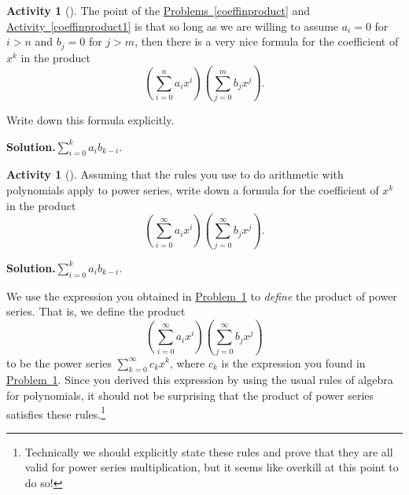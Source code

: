 \documentclass[10pt,]{book}
\theoremstyle{plain}
\theoremstyle{definition}
\newtheorem{activity}[project]{Activity}
\numberwithin{equation}{chapter}
\begin{document}
\begin{activity}[]\label{activity-162}
The point of the \hyperref[coeffinproduct]{Problems~\ref{coeffinproduct}} and \hyperref[coeffinproduct1]{Activity~\ref{coeffinproduct1}} is that so long as we are willing to assume \(a_i=0\) for \(i>n\) and \(b_j =0\) for \(j>m\), then there is a very nice formula for the coefficient of \(x^k\) in the product%
\begin{equation*}
\left(\sum_{i=0}^n a_ix^i\right)\left(\sum_{j=0}^m b_jx^j\right).
\end{equation*}
%
\par
Write down this formula explicitly.%
\par\medskip\noindent%
\textbf{Solution.}\quad \(\sum_{i=0}^k a_ib_{k-i}\).%
\end{activity}
\begin{activity}[]\label{coeffinpowerseries}
Assuming that the rules you use to do arithmetic with polynomials apply to power series, write down a formula for the coefficient of \(x^k\) in the product%
\begin{equation*}
\left(\sum_{i=0}^\infty a_ix^i\right)\left(\sum_{j=0}^\infty
b_jx^j\right).
\end{equation*}
%
\par\medskip\noindent%
\textbf{Solution.}\quad \(\sum_{i=0}^k a_ib_{k-i}\).%
\end{activity}
We use the expression you obtained in \hyperref[coeffinpowerseries]{Problem~\ref{coeffinpowerseries}} to \emph{define} the product of power series. That is, we define the product%
\begin{equation*}
\left(\sum_{i=0}^\infty a_ix^i\right)\left(\sum_{j=0}^\infty
b_jx^j\right)
\end{equation*}
to be the power series \(\sum_{k=0}^\infty c_k x^k\), where \(c_k\) is the expression you found in \hyperref[coeffinpowerseries]{Problem~\ref{coeffinpowerseries}}. Since you derived this expression by using the usual rules of algebra for polynomials, it should not be surprising that the product of power series satisfies these rules.\footnote{Technically we should explicitly state these rules and prove that they are all valid for power series multiplication, but it seems like overkill at this point to do so!\label{fn-11}}%
\typeout{************************************************}
\typeout{************************************************}
\end{document}
